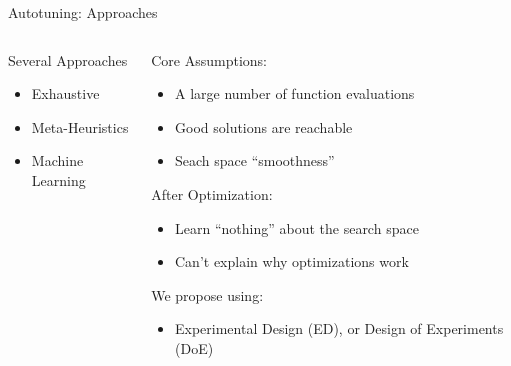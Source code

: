 \documentclass[10pt, compress, aspectratio=169, xcolor={table,usenames,dvipsnames}]{beamer}
\begin{document}
\begin{frame}[label={sec:orga11c9e0}]{Autotuning: Approaches}
\begin{columns}
\begin{column}{0.5\columnwidth}
\begin{block}{Several Approaches}
\footnotesize
\begin{itemize}
\item \colorbox{red!25}{Exhaustive}
\item \colorbox{green!25}{Meta-Heuristics}
\item \colorbox{cyan!25}{Machine Learning}
\end{itemize}
\normalsize

\vspace{-.4cm}


\end{block}
\end{column}

\begin{column}{0.5\columnwidth}
\begin{block}{Core Assumptions:}
\begin{itemize}
\item A large number of function evaluations
\item Good solutions are reachable
\item Seach space ``smoothness''
\end{itemize}
\begin{block}{After Optimization:}
\begin{itemize}
\item \alert{Learn ``nothing''} about the search space
\item \alert{Can't explain} why optimizations work
\end{itemize}
\end{block}
\begin{block}{We propose using:}
\begin{itemize}
\item \alert{Experimental Design} (\alert{ED}), or \alert{Design of Experiments} (\alert{DoE})
\end{itemize}
\end{block}
\end{block}
\end{column}
\end{columns}
\end{frame}
\end{document}
